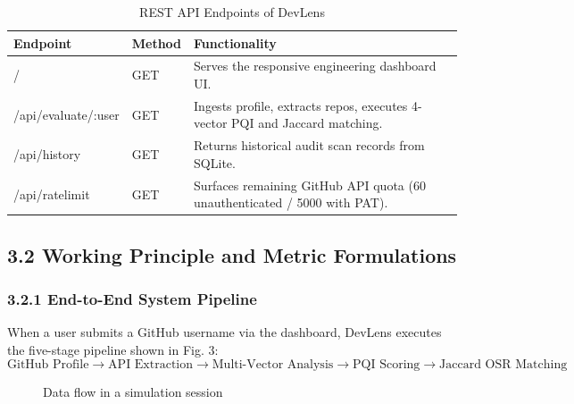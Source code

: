 \documentclass[12pt,a4paper]{article}
\begin{document}
\begin{table}[h!]
\centering
\caption{REST API Endpoints of DevLens}
\label{tab:routes}
\small
\begin{tabularx}{\textwidth}{|p{3.8cm}|p{2cm}|X|}
\hline
\textbf{Endpoint} & \textbf{Method} & \textbf{Functionality} \\ \hline
/ & GET & Serves the responsive engineering dashboard UI. \\ \hline
/api/evaluate/:user & GET & Ingests profile, extracts repos, executes 4-vector PQI and Jaccard matching. \\ \hline
/api/history & GET & Returns historical audit scan records from SQLite. \\ \hline
/api/ratelimit & GET & Surfaces remaining GitHub API quota (60 unauthenticated / 5000 with PAT). \\ \hline
\end{tabularx}
\end{table}

\newpage
\thispagestyle{fancy}
\subsection{3.2 Working Principle and Metric Formulations}

\subsubsection{3.2.1 End-to-End System Pipeline}
When a user submits a GitHub username via the dashboard, DevLens executes the five-stage pipeline shown in Fig. 3:
$$\text{GitHub Profile} \longrightarrow \text{API Extraction} \longrightarrow \text{Multi-Vector Analysis} \longrightarrow \text{PQI Scoring} \longrightarrow \text{Jaccard OSR Matching}$$

\begin{figure}[h!]
\centering
\vspace{0.3cm}
\vspace{0.3cm}
\caption{Data flow in a simulation session}
\end{figure}
\end{document}

